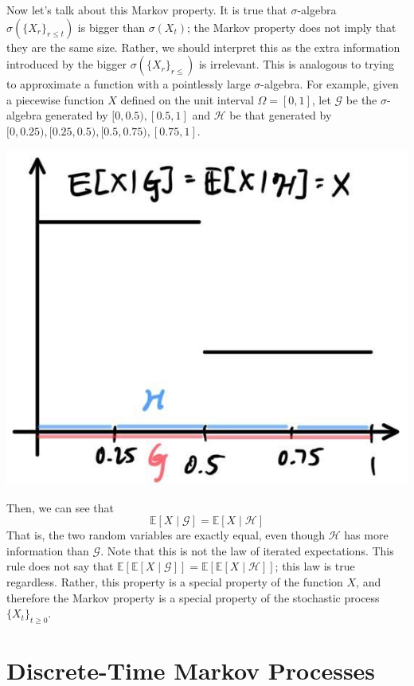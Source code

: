 \documentclass{article}
\theoremstyle{definition}
\theoremstyle{remark}
\theoremstyle{definition}
\begin{document}
Now let's talk about this Markov property. It is true that $\sigma$-algebra $\sigma(\{X_r\}_{r \leq t})$ is bigger than $\sigma(X_t)$; the Markov property does not imply that they are the same size. Rather, we should interpret this as the extra information introduced by the bigger $\sigma(\{X_r\}_{r \leq})$ is irrelevant. This is analogous to trying to approximate a function with a pointlessly large $\sigma$-algebra. For example, given a piecewise function $X$ defined on the unit interval $\Omega = [0, 1]$, let $\mathcal{G}$ be the $\sigma$-algebra generated by $[0, 0.5), [0.5, 1]$ and $\mathcal{H}$ be that generated by $[0, 0.25), [0.25, 0.5), [0.5, 0.75), [0.75, 1]$. 
\begin{center}
    \includegraphics[scale=0.3]{img/pointless_approximation.jpg}
\end{center}
Then, we can see that 
\[\mathbb{E}[X \mid \mathcal{G}] = \mathbb{E}[X \mid \mathcal{H}]\]
That is, the two random variables are exactly equal, even though $\mathcal{H}$ has more information than $\mathcal{G}$. Note that this is not the law of iterated expectations. This rule does not say that $\mathbb{E}[\mathbb{E}[X \mid \mathcal{G}]] = \mathbb{E}[ \mathbb{E}[X \mid \mathcal{H}]]$; this law is true regardless. Rather, this property is a special property of the function $X$, and therefore the Markov property is a special property of the stochastic process $\{X_t\}_{t \geq 0}$. 


\section{Discrete-Time Markov Processes}
\end{document}
